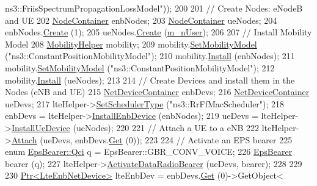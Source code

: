 \begin{DoxyCode}
{      ns3::FriisSpectrumPropagationLossModel"}));
200 
201   \textcolor{comment}{// Create Nodes: eNodeB and UE}
202   \hyperlink{classns3_1_1NodeContainer}{NodeContainer} enbNodes;
203   \hyperlink{classns3_1_1NodeContainer}{NodeContainer} ueNodes;
204   enbNodes.\hyperlink{classns3_1_1NodeContainer_a787f059e2813e8b951cc6914d11dfe69}{Create} (1);
205   ueNodes.\hyperlink{classns3_1_1NodeContainer_a787f059e2813e8b951cc6914d11dfe69}{Create} (\hyperlink{classLenaRrFfMacSchedulerTestCase_a8973c6783abfcb4f86d2eed09f96771e}{m\_nUser});
206 
207   \textcolor{comment}{// Install Mobility Model}
208   \hyperlink{classns3_1_1MobilityHelper}{MobilityHelper} mobility;
209   mobility.\hyperlink{classns3_1_1MobilityHelper_a030275011b6f40682e70534d30280aba}{SetMobilityModel} (\textcolor{stringliteral}{"ns3::ConstantPositionMobilityModel"});
210   mobility.\hyperlink{classns3_1_1MobilityHelper_a07737960ee95c0777109cf2994dd97ae}{Install} (enbNodes);
211   mobility.\hyperlink{classns3_1_1MobilityHelper_a030275011b6f40682e70534d30280aba}{SetMobilityModel} (\textcolor{stringliteral}{"ns3::ConstantPositionMobilityModel"});
212   mobility.\hyperlink{classns3_1_1MobilityHelper_a07737960ee95c0777109cf2994dd97ae}{Install} (ueNodes);
213 
214   \textcolor{comment}{// Create Devices and install them in the Nodes (eNB and UE)}
215   \hyperlink{classns3_1_1NetDeviceContainer}{NetDeviceContainer} enbDevs;
216   \hyperlink{classns3_1_1NetDeviceContainer}{NetDeviceContainer} ueDevs;
217   lteHelper->\hyperlink{classns3_1_1LteHelper_a8f86e55b8b80a81732c4b2df00fb25d5}{SetSchedulerType} (\textcolor{stringliteral}{"ns3::RrFfMacScheduler"});
218   enbDevs = lteHelper->\hyperlink{classns3_1_1LteHelper_a5e009ad35ef85f46b5a6099263f15a03}{InstallEnbDevice} (enbNodes);
219   ueDevs = lteHelper->\hyperlink{classns3_1_1LteHelper_ac9cd932d7de92811cfa953c2e3b2fc9f}{InstallUeDevice} (ueNodes);
220 
221   \textcolor{comment}{// Attach a UE to a eNB}
222   lteHelper->\hyperlink{classns3_1_1LteHelper_a9466743f826aa2652a87907b7f0a1c87}{Attach} (ueDevs, enbDevs.\hyperlink{classns3_1_1NetDeviceContainer_a677d62594b5c9d2dea155cc5045f4d0b}{Get} (0));
223 
224   \textcolor{comment}{// Activate an EPS bearer}
225   \textcolor{keyword}{enum} \hyperlink{structns3_1_1EpsBearer_aecf0c67109c5eb4ec0b07226fff5885e}{EpsBearer::Qci} q = EpsBearer::GBR\_CONV\_VOICE;
226   \hyperlink{structns3_1_1EpsBearer}{EpsBearer} bearer (q);
227   lteHelper->\hyperlink{classns3_1_1LteHelper_ac896e16cf162e4beeaa292d39ab1b700}{ActivateDataRadioBearer} (ueDevs, bearer);
228   
229  
230   \hyperlink{classns3_1_1Ptr}{Ptr<LteEnbNetDevice>} lteEnbDev = enbDevs.\hyperlink{classns3_1_1NetDeviceContainer_a677d62594b5c9d2dea155cc5045f4d0b}{Get} (0)->GetObject<

\end{DoxyCode}
